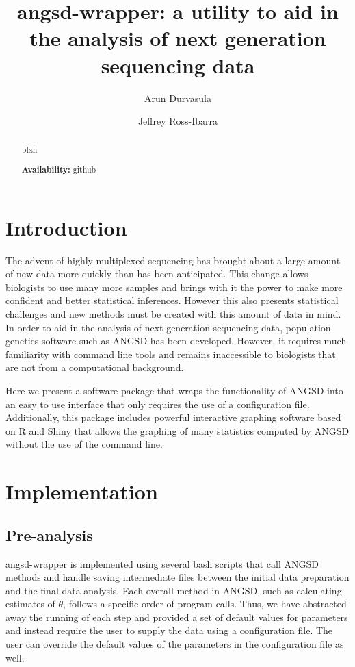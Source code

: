 \documentclass[12pt]{article}
\title{angsd-wrapper: a utility to aid in the analysis of next generation sequencing data}
\author[1]{Arun Durvasula}
\author[1,2]{Jeffrey Ross-Ibarra}
\affil[1]{Department of Plant Sciences, University of California Davis}
\affil[2]{Center for Population Biology and Genome Center, University of California Davis}
\date{}
\begin{document}
\maketitle

\begin{abstract}
blah

\textbf{Availability:} github
\end{abstract}

\section*{Introduction}
The advent of highly multiplexed sequencing has brought about a large amount of new data more quickly than has been anticipated. 
This change allows biologists to use many more samples and brings with it the power to make more confident and better statistical inferences.  %
However this also presents statistical challenges and new methods must be created with this amount of data in mind. 
In order to aid in the analysis of next generation sequencing data, population genetics software such as ANGSD has been developed. 
However, it requires much familiarity with command line tools and remains inaccessible to biologists that are not from a computational background. 

Here we present a software package that wraps the functionality of ANGSD into an easy to use interface that only requires the use of a configuration file. 
Additionally, this package includes powerful interactive graphing software based on R and Shiny that allows the graphing of many statistics computed by ANGSD without the use of the command line.

\section*{Implementation}

\subsection*{Pre-analysis}
angsd-wrapper is implemented using several bash scripts that call ANGSD methods and handle saving intermediate files between the initial data preparation and the final data analysis. 
Each overall method in ANGSD, such as calculating estimates of $\theta$, follows a specific order of program calls. 
Thus, we have abstracted away the running of each step and provided a set of default values for parameters and instead require the user to supply the data using a configuration file. 
The user can override the default values of the parameters in the configuration file as well. 
\end{document}
